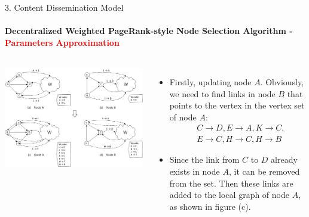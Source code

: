 \documentclass{beamer}		%
\begin{document}
\begin{frame}{3. Content Dissemination Model}
\framesubtitle{Decentralized Weighted PageRank-style Node Selection Algorithm - \textcolor{red}{Parameters Approximation}}
\begin{columns}
\includegraphics[scale=0.048]{imgs/Fig3.png}
\begin{itemize}
    \item Firstly, updating node $A$. Obviously, we need to find links in node $B$ that points to the vertex in the vertex set of node $A$: 
    \begin{align*}
    &C\rightarrow D, E\rightarrow A, K\rightarrow C,\\
    &E\rightarrow C, H\rightarrow C, H\rightarrow B
    \end{align*}
    
    
    \item Since the link from $C$ to $D$ already exists in node $A$, it can be removed from the set. Then these links are added to the local graph of node $A$, as shown in figure (c).
\end{itemize}
\end{columns}
\end{frame}
\end{document}
